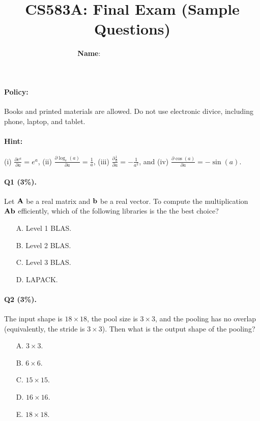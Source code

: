 \documentclass[11pt]{article}
\numberwithin{equation}{section}
\def\A{{\bf A}}
\def\bb{{\bf b}}
\begin{document}


\title{CS583A: Final Exam (Sample Questions)}

\author{{\bf Name}: ~~~~~~~~~\qquad ~~~~~ \qquad~~~~~~~~~}

\date{ }

\maketitle



\paragraph{Policy:}
Books and printed materials are allowed. Do not use electronic divice, including phone, laptop, and tablet.

\paragraph{Hint:} (i) $\frac{\partial  e^a}{\partial a} = e^a$, (ii) $\frac{ \partial \log_e (a) }{\partial a  } = \frac{1}{a}$, (iii) $\frac{ \partial \frac{1}{a} }{\partial a  } = - \frac{1}{a^2}$, and (iv) $\frac{ \partial \cos (a) }{\partial a  } = - \sin (a)$.



\paragraph{Q1 (3\%).} 
Let $\A$ be a real matrix and $\bb$ be a real vector.
To compute the multiplication $\A \bb$ efficiently,
which of the following libraries is the the best choice?
\begin{itemize}
	\item[A.]
	Level 1 BLAS.
	\item[B.]
	Level 2 BLAS.
	\item[C.]
	Level 3 BLAS.
	\item[D.]
	LAPACK.
\end{itemize}


\paragraph{Q2 (3\%).} 
The input shape is $18\times 18$, the pool size is $3\times 3$, and the pooling has no overlap (equivalently, the stride is $3\times 3$).
Then what is the output shape of the pooling?
\begin{itemize}
	\item[A.]
	$3\times 3$.
	\item[B.]
	$6\times 6$.
	\item[C.]
	$15\times 15$.
	\item[D.]
	$16\times 16$.
	\item[E.]
	$18\times 18$.
\end{itemize}
\end{document}
